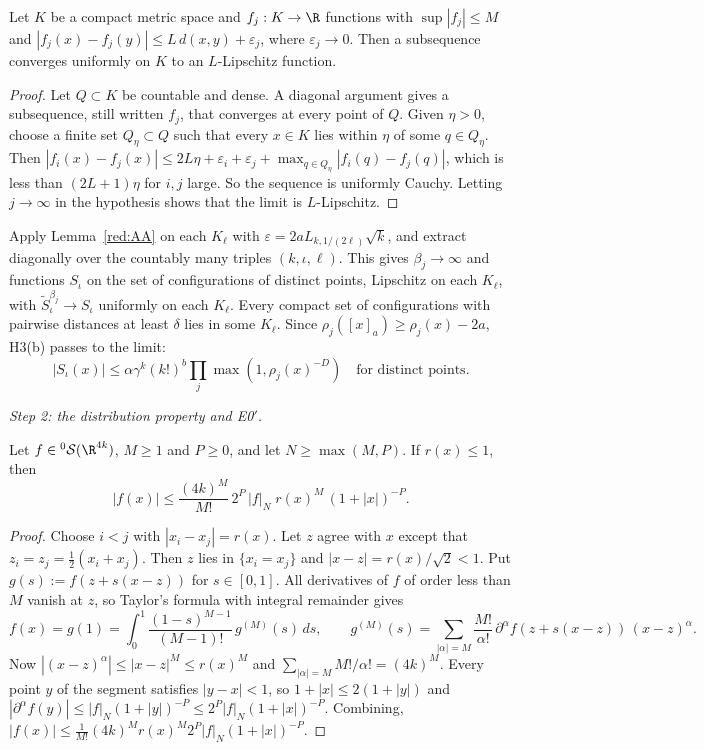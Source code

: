 \begin{lemma}\label{red:AA}
Let $K$ be a compact metric space and $f_j:K\to\R$ functions with $\sup|f_j|\le M$ and $|f_j(x)-f_j(y)|\le L\,d(x,y)+\varepsilon_j$, where $\varepsilon_j\to0$. Then a subsequence converges uniformly on $K$ to an $L$-Lipschitz function.
\end{lemma}

\begin{proof}
Let $Q\subset K$ be countable and dense. A diagonal argument gives a subsequence, still written $f_j$, that converges at every point of $Q$. Given $\eta>0$, choose a finite set $Q_\eta\subset Q$ such that every $x\in K$ lies within $\eta$ of some $q\in Q_\eta$. Then $|f_i(x)-f_j(x)|\le2L\eta+\varepsilon_i+\varepsilon_j+\max_{q\in Q_\eta}|f_i(q)-f_j(q)|$, which is less than $(2L+1)\eta$ for $i,j$ large. So the sequence is uniformly Cauchy. Letting $j\to\infty$ in the hypothesis shows that the limit is $L$-Lipschitz.
\end{proof}

Apply Lemma~\ref{red:AA} on each $K_\ell$ with $\varepsilon=2aL_{k,1/(2\ell)}\sqrt k$, and extract diagonally over the countably many triples $(k,\iota,\ell)$. This gives $\beta_j\to\infty$ and functions $S_\iota$ on the set of configurations of distinct points, Lipschitz on each $K_\ell$, with $\tilde S^{\beta_j}_\iota\to S_\iota$ uniformly on each $K_\ell$. Every compact set of configurations with pairwise distances at least $\delta$ lies in some $K_\ell$. Since $\rho_j([x]_a)\ge\rho_j(x)-2a$, H3(b) passes to the limit:
\begin{equation}\label{red:growth-limit}
  |S_\iota(x)|\le\alpha\gamma^k(k!)^b\prod_{j}\max(1,\rho_j(x)^{-D})\quad\text{for distinct points.}
\end{equation}

\emph{Step 2: the distribution property and E0$'$.}

\begin{lemma}[Taylor]\label{red:taylor}
Let $f\in{}^0\mathcal S(\R^{4k})$, $M\ge1$ and $P\ge0$, and let $N\ge\max(M,P)$. If $r(x)\le1$, then
\[
  |f(x)|\le\frac{(4k)^M}{M!}\,2^P\,|f|_N\;r(x)^M\,(1+|x|)^{-P}.
\]
\end{lemma}

\begin{proof}
Choose $i<j$ with $|x_i-x_j|=r(x)$. Let $z$ agree with $x$ except that $z_i=z_j=\tfrac12(x_i+x_j)$. Then $z$ lies in $\{x_i=x_j\}$ and $|x-z|=r(x)/\sqrt2<1$. Put $g(s):=f(z+s(x-z))$ for $s\in[0,1]$. All derivatives of $f$ of order less than $M$ vanish at $z$, so Taylor's formula with integral remainder gives
\[
  f(x)=g(1)=\int_0^1\frac{(1-s)^{M-1}}{(M-1)!}\,g^{(M)}(s)\,ds,
  \qquad
  g^{(M)}(s)=\sum_{|\alpha|=M}\frac{M!}{\alpha!}\,\partial^\alpha f(z+s(x-z))\,(x-z)^\alpha .
\]
Now $|(x-z)^\alpha|\le|x-z|^M\le r(x)^M$ and $\sum_{|\alpha|=M}M!/\alpha!=(4k)^M$. Every point $y$ of the segment satisfies $|y-x|<1$, so $1+|x|\le2(1+|y|)$ and $|\partial^\alpha f(y)|\le|f|_N(1+|y|)^{-P}\le2^P|f|_N(1+|x|)^{-P}$. Combining, $|f(x)|\le\frac{1}{M!}(4k)^M r(x)^M2^P|f|_N(1+|x|)^{-P}$.
\end{proof}

